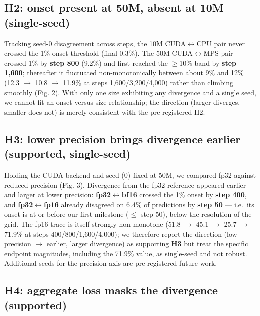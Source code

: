 \documentclass{article}
\begin{document}
\subsection{H2: onset present at 50M, absent at 10M (single-seed)}\label{h2-onset-present-at-50m-absent-at-10m-single-seed}

Tracking seed-0 disagreement across steps, the 10M CUDA$\leftrightarrow$CPU pair never crossed the 1\% onset
threshold (final 0.3\%). The 50M CUDA$\leftrightarrow$MPS pair crossed 1\% by \textbf{step 800} (9.2\%) and first
reached the $\ge$10\% band by \textbf{step 1,600}; thereafter it fluctuated non-monotonically between
about 9\% and 12\% (12.3 $\rightarrow$ 10.8 $\rightarrow$ 11.9\% at steps 1,600/3,200/4,000) rather than climbing
smoothly (Fig. 2). With only one size exhibiting any divergence and a single seed, we cannot
fit an onset-versus-size relationship; the direction (larger diverges, smaller does not) is
merely consistent with the pre-registered H2.

\subsection{H3: lower precision brings divergence earlier (supported, single-seed)}\label{h3-lower-precision-brings-divergence-earlier-supported-single-seed}

Holding the CUDA backend and seed (0) fixed at 50M, we compared fp32 against reduced precision
(Fig. 3). Divergence from the fp32 reference appeared earlier and larger at lower precision:
\textbf{fp32$\leftrightarrow$bf16} crossed the 1\% onset by \textbf{step 400}, and \textbf{fp32$\leftrightarrow$fp16} already disagreed on 6.4\%
of predictions by \textbf{step 50} --- i.e.~its onset is at or before our first milestone ($\le$ step 50),
below the resolution of the grid. The fp16 trace is itself strongly non-monotone
(51.8 $\rightarrow$ 45.1 $\rightarrow$ 25.7 $\rightarrow$ 71.9\% at steps 400/800/1,600/4,000); we therefore report the direction
(low precision $\rightarrow$ earlier, larger divergence) as supporting \textbf{H3} but treat the specific
endpoint magnitudes, including the 71.9\% value, as single-seed and not robust. Additional seeds
for the precision axis are pre-registered future work.

\subsection{H4: aggregate loss masks the divergence (supported)}\label{h4-aggregate-loss-masks-the-divergence-supported}
\end{document}
